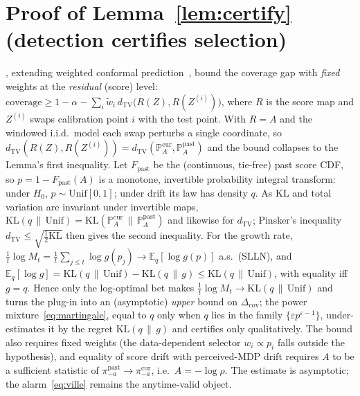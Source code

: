 \documentclass[sigconf]{aamas}
\newcommand{\picur}{\pi^{\mathrm{cur}}_{-a}}
\newcommand{\pipast}{\pi^{\mathrm{past}}_{-a}}
\newcommand{\KL}{\mathrm{KL}}
\newcommand{\dTV}{d_{\mathrm{TV}}}
\begin{document}
\section{Proof of Lemma~\ref{lem:certify} (detection certifies selection)}
\label{app:certify}
\citet{barber2023beyond}, extending weighted conformal
prediction~\citep{tibshirani2019conformal}, bound the coverage gap with
\emph{fixed} weights at the \emph{residual} (score) level:
$\text{coverage}\ge1-\alpha-\sum_i\tilde w_i\,\dTV\!\big(R(Z),R(Z^{(i)})\big)$,
where $R$ is the score map and $Z^{(i)}$ swaps calibration point $i$ with the test
point. With $R=A$ and the windowed i.i.d.\ model each swap perturbs a single
coordinate, so $\dTV(R(Z),R(Z^{(i)}))=\dTV(\mathbb{P}^{\mathrm{cur}}_A,
\mathbb{P}^{\mathrm{past}}_A)$ and the bound collapses to the Lemma's first
inequality. Let $F_{\mathrm{past}}$ be the (continuous, tie-free) past score CDF,
so $p=1-F_{\mathrm{past}}(A)$ is a monotone, invertible probability integral
transform: under $H_0$, $p\sim\mathrm{Unif}[0,1]$; under drift its law has density
$q$. As $\KL$ and total variation are invariant under invertible maps,
$\KL(q\,\|\,\mathrm{Unif})=\KL(\mathbb{P}^{\mathrm{cur}}_A\,\|\,\mathbb{P}^{\mathrm{past}}_A)$
and likewise for $\dTV$; Pinsker's inequality $\dTV\le\sqrt{\tfrac12\KL}$ then gives
the second inequality. For the growth rate,
$\tfrac1t\log M_t=\tfrac1t\sum_{j\le t}\log g(p_j)\to\mathbb{E}_q[\log g(p)]$ a.s.\
(SLLN), and
$\mathbb{E}_q[\log g]=\KL(q\,\|\,\mathrm{Unif})-\KL(q\,\|\,g)\le\KL(q\,\|\,\mathrm{Unif})$,
with equality iff $g=q$. Hence only the log-optimal bet makes
$\tfrac1t\log M_t\to\KL(q\,\|\,\mathrm{Unif})$ and turns the plug-in into an
(asymptotic) \emph{upper} bound on $\Delta_{\mathrm{cov}}$; the power
mixture~\eqref{eq:martingale}, equal to $q$ only when $q$ lies in the family
$\{\varepsilon p^{\varepsilon-1}\}$, under-estimates it by the regret
$\KL(q\,\|\,g)$ and certifies only qualitatively. The bound also requires fixed
weights (the data-dependent selector $w_i\propto p_i$ falls outside the
hypothesis), and equality of score drift with perceived-MDP drift requires $A$ to
be a sufficient statistic of $\pipast\!\to\!\picur$, i.e.\ $A=-\log\rho$. The
estimate is asymptotic; the alarm~\eqref{eq:ville} remains the anytime-valid
object.
\end{document}
